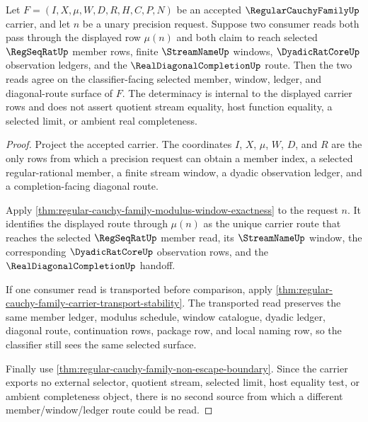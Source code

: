 \begin{theorem}
\label{thm:regular-cauchy-family-member-selection-determinacy}
Let $F=(I,X,\mu,W,D,R,H,C,P,N)$ be an accepted $\RegularCauchyFamilyUp$ carrier, and let $n$ be a unary precision request. Suppose two consumer reads both pass through the displayed row $\mu(n)$ and both claim to reach selected $\RegSeqRatUp$ member rows, finite $\StreamNameUp$ windows, $\DyadicRatCoreUp$ observation ledgers, and the $\RealDiagonalCompletionUp$ route. Then the two reads agree on the classifier-facing selected member, window, ledger, and diagonal-route surface of $F$. The determinacy is internal to the displayed carrier rows and does not assert quotient stream equality, host function equality, a selected limit, or ambient real completeness.
\end{theorem}
\begin{proof}
Project the accepted carrier. The coordinates $I$, $X$, $\mu$, $W$, $D$, and $R$ are the only rows from which a precision request can obtain a member index, a selected regular-rational member, a finite stream window, a dyadic observation ledger, and a completion-facing diagonal route.

Apply \autoref{thm:regular-cauchy-family-modulus-window-exactness} to the request $n$. It identifies the displayed route through $\mu(n)$ as the unique carrier route that reaches the selected $\RegSeqRatUp$ member read, its $\StreamNameUp$ window, the corresponding $\DyadicRatCoreUp$ observation rows, and the $\RealDiagonalCompletionUp$ handoff.

If one consumer read is transported before comparison, apply \autoref{thm:regular-cauchy-family-carrier-transport-stability}. The transported read preserves the same member ledger, modulus schedule, window catalogue, dyadic ledger, diagonal route, continuation rows, package row, and local naming row, so the classifier still sees the same selected surface.

Finally use \autoref{thm:regular-cauchy-family-non-escape-boundary}. Since the carrier exports no external selector, quotient stream, selected limit, host equality test, or ambient completeness object, there is no second source from which a different member/window/ledger route could be read.
\end{proof}

